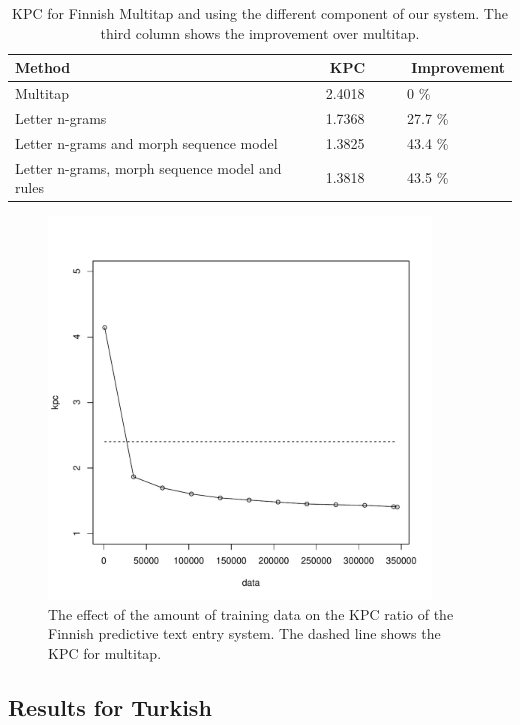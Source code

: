 \documentclass{llncs}
\begin{document}
\begin{table}
\begin{center}
\caption{KPC for Finnish Multitap and using the different component of
  our system. The third column shows the improvement over
  multitap.}\label{Finnish-kpc-table}
\begin{tabular}{lll}
\hline
Method &~~~~KPC &~~~~Improvement\\
\hline
Multitap                                       &~~~~2.4018 &~~~~0 \%\\
Letter n-grams                                 &~~~~1.7368 &~~~~27.7 \%\\
Letter n-grams and morph sequence model        &~~~~1.3825 &~~~~43.4 \%\\
Letter n-grams, morph sequence model and rules &~~~~1.3818 &~~~~43.5 \%\\
\hline
\end{tabular}
\end{center}
\end{table}

\begin{figure}[hbt!]
\includegraphics[width=4in]{finnish_kpc_figure.pdf}
\caption{The effect of the amount of training data on the KPC ratio of
  the Finnish predictive text entry system. The dashed line shows the
  KPC for multitap.}\label{fi-kpc-graph}
\end{figure}

\subsection{Results for Turkish}
\end{document}
